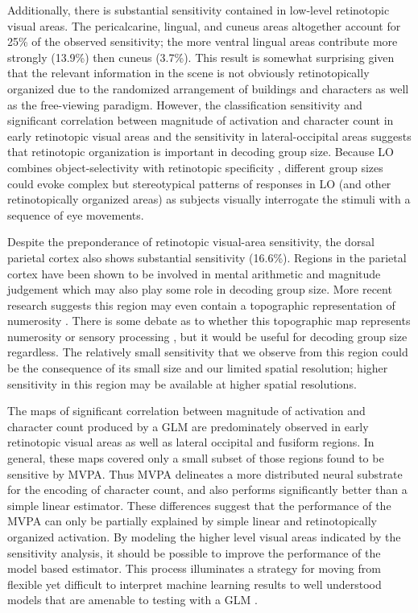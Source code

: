 \documentclass[5p,authoryear]{elsarticle}
\begin{document}
Additionally, there is substantial sensitivity contained in low-level retinotopic visual areas. 
The pericalcarine, lingual, and cuneus areas altogether account for 25\% of the observed sensitivity; the more ventral lingual areas contribute more strongly (13.9\%) then cuneus (3.7\%).
This result is somewhat surprising given that the relevant information in the scene is not obviously retinotopically organized due to the randomized arrangement of buildings and characters as well as the free-viewing paradigm.
However, the classification sensitivity and significant correlation between magnitude of activation and character count in early retinotopic visual areas and the sensitivity in lateral-occipital areas suggests that retinotopic organization is important in decoding group size. 
Because LO combines object-selectivity with retinotopic specificity \citep{Sayres2008}, different group sizes could evoke complex but stereotypical patterns of responses in LO (and other retinotopically organized areas) as subjects visually interrogate the stimuli with a sequence of eye movements. 

Despite the preponderance of retinotopic visual-area sensitivity, the dorsal parietal cortex also shows substantial sensitivity (16.6\%).
Regions in the parietal cortex have been shown to be involved in mental arithmetic and magnitude judgement \citep{Rickard2000} which may also play some role in decoding group size.
More recent research suggests this region may even contain a topographic representation of numerosity \citep{Harvey2013}.
There is some debate as to whether this topographic map represents numerosity or sensory processing \citep{Gebuis2013}, but it would be useful for decoding group size regardless. 
The relatively small sensitivity that we observe from this region could be the consequence of its small size and our limited spatial resolution; higher sensitivity in this region may be available at higher spatial resolutions.

The maps of significant correlation between magnitude of activation and character count produced by a GLM are predominately observed in early retinotopic visual areas as well as lateral occipital and fusiform regions.
In general, these maps covered only a small subset of those regions found to be sensitive by MVPA.
Thus MVPA delineates a more distributed neural substrate for the encoding of character count, and also performs significantly better than a simple linear estimator.
These differences suggest that the performance of the MVPA can only be partially explained by simple linear and retinotopically organized activation.
By modeling the higher level visual areas indicated by the sensitivity analysis, it should be possible to improve the performance of the model based estimator.
This process illuminates a strategy for moving from flexible yet difficult to interpret machine learning results to well understood models that are amenable to testing with a GLM .
\end{document}
